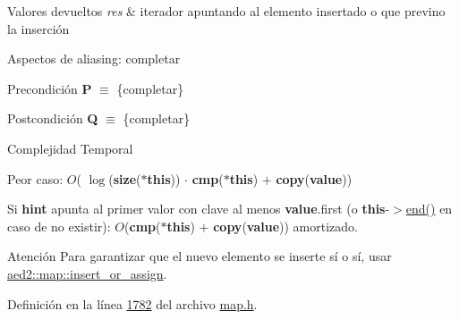 \begin{DoxyRetVals}{Valores devueltos}
{\em res} & iterador apuntando al elemento insertado o que previno la inserción\\
\hline
\end{DoxyRetVals}
\begin{DoxyParagraph}{Aspectos de aliasing\+:}
completar
\end{DoxyParagraph}
\begin{DoxyPrecond}{Precondición}
{\bfseries P} $\equiv$ \{completar\} 
\end{DoxyPrecond}
\begin{DoxyPostcond}{Postcondición}
{\bfseries Q} $\equiv$ \{completar\}
\end{DoxyPostcond}

\begin{DoxyDescription}
\item[Complejidad Temporal]
\begin{DoxyItemize}
\item Peor caso\+: $O$( $\log$({\bfseries size}({\bfseries $\ast$this})) $\cdot$ {\bfseries cmp}({\bfseries $\ast$this}) $+$ {\bfseries copy}({\bfseries value}))
\item Si {\bfseries hint} apunta al primer valor con clave al menos {\bfseries value}.first (o {\bfseries this}-\/$>$\hyperlink{classaed2_1_1map_a76023e6a56cb625513e1b5ea028bf983_a76023e6a56cb625513e1b5ea028bf983}{end()} en caso de no existir)\+: $O$({\bfseries cmp}({\bfseries $\ast$this}) $+$ {\bfseries copy}({\bfseries value})) amortizado. 
\end{DoxyItemize}
\end{DoxyDescription}

\begin{DoxyAttention}{Atención}
Para garantizar que el nuevo elemento se inserte sí o sí, usar \hyperlink{classaed2_1_1map_a2ef6723c183916276b0afc4a4c721475_a2ef6723c183916276b0afc4a4c721475}{aed2\+::map\+::insert\+\_\+or\+\_\+assign}. 
\end{DoxyAttention}


Definición en la línea \hyperlink{map_8h_source_l01782}{1782} del archivo \hyperlink{map_8h_source}{map.\+h}.

\mbox{\label{classaed2_1_1map_a056322ff63d37b43d042ffa0378c9fd2_a056322ff63d37b43d042ffa0378c9fd2}} 
